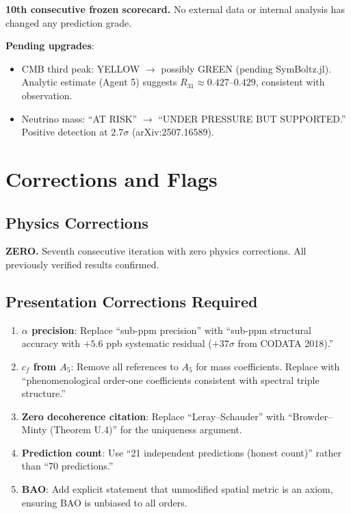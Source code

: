 \documentclass[11pt,a4paper]{article}
\begin{document}
\textbf{10th consecutive frozen scorecard.} No external data or internal analysis has changed any prediction grade.

\textbf{Pending upgrades}:
\begin{itemize}
\item CMB third peak: YELLOW $\to$ possibly GREEN (pending SymBoltz.jl). Analytic estimate (Agent 5) suggests $R_{31} \approx 0.427$--$0.429$, consistent with observation.
\item Neutrino mass: ``AT RISK'' $\to$ ``UNDER PRESSURE BUT SUPPORTED.'' Positive detection at $2.7\sigma$ (arXiv:2507.16589).
\end{itemize}


\section{Corrections and Flags}

\subsection{Physics Corrections}
\textbf{ZERO.} Seventh consecutive iteration with zero physics corrections. All previously verified results confirmed.

\subsection{Presentation Corrections Required}

\begin{enumerate}
\item \textbf{$\alpha$ precision}: Replace ``sub-ppm precision'' with ``sub-ppm structural accuracy with $+5.6$ ppb systematic residual ($+37\sigma$ from CODATA 2018).''
\item \textbf{$c_f$ from $A_5$}: Remove all references to $A_5$ for mass coefficients. Replace with ``phenomenological order-one coefficients consistent with spectral triple structure.''
\item \textbf{Zero decoherence citation}: Replace ``Leray--Schauder'' with ``Browder--Minty (Theorem U.4)'' for the uniqueness argument.
\item \textbf{Prediction count}: Use ``21 independent predictions (honest count)'' rather than ``70 predictions.''
\item \textbf{BAO}: Add explicit statement that unmodified spatial metric is an axiom, ensuring BAO is unbiased to all orders.
\end{enumerate}
\end{document}
